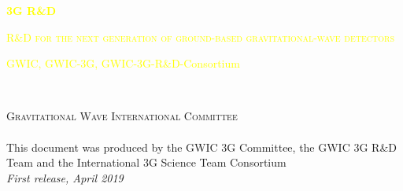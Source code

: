 
\begingroup
\thispagestyle{empty}

\centering
\par\normalfont\fontsize{50}{50}\sffamily\selectfont
\textcolor{yellow}{\textbf{3G R\&D}}\\
\vskip6.5cm
\par\normalfont\fontsize{25}{25}\sffamily\selectfont
\textsc{\textcolor{yellow}{{R\&D for the next generation of ground-based gravitational-wave detectors}}}\par %
\vskip4cm
\textcolor{yellow}{\LARGE GWIC, GWIC-3G, GWIC-3G-R\&D-Consortium}\par %
\endgroup


\newpage
~\vfill
\thispagestyle{empty}


\noindent \textsc{Gravitational Wave International Committee}\\

\noindent \textsc{}\\ %

\noindent This document was produced by the GWIC 3G Committee, the GWIC 3G R\&D Team and the International 3G Science Team Consortium\\ %

\noindent \textit{First release, April 2019} %
\newpage


\pagestyle{empty} %
\tableofcontents %
\pagestyle{fancy} %
